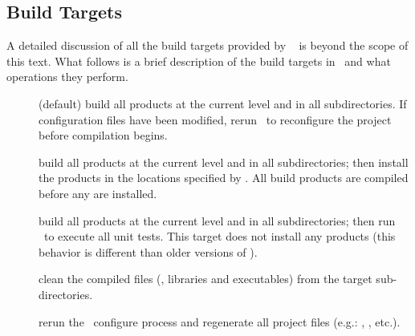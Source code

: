 \subsection{Build Targets}

A detailed discussion of all the build targets provided by \cmake~\cite{cmake} is beyond the scope of this text. 
What follows is a brief description of the build targets in \draco\ and what operations they perform.
\begin{description}
\item[] (default) build all products at the current level and in all subdirectories.  If configuration files have been modified, rerun \cmake\ to reconfigure the project before compilation begins.
\item[] build all products at the current level and in all subdirectories; then install the products in the locations specified by .  All build products are compiled before any are installed. 
\item[] build all products at the current level and in all subdirectories; then run \ctest\ to execute all unit tests.  This target does not install any products (this behavior is different than older versions of \draco).
\item[] clean the compiled files (, libraries and executables) from the target sub-directories.
\item[] rerun the \cmake\ configure process and regenerate all project files (e.g.: , , etc.).

\end{description}

